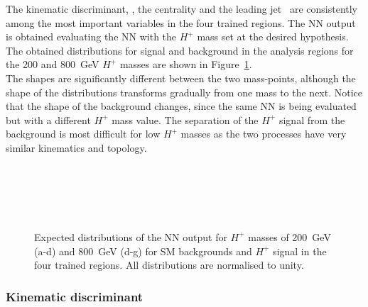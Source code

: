 The kinematic discriminant, \HTjets, the centrality and the leading jet \pT\ are consistently among the most important variables in the four trained regions. The NN output is obtained evaluating the NN with the $H^+$ mass set at the desired hypothesis. The obtained distributions for signal and background in the analysis regions for the 200 and 800~GeV $H^+$ masses are shown in Figure~\ref{Hplustb:NNshapes}.\\

The shapes are significantly different between the two mass-points, although the shape of the distributions transforms gradually from one mass to the next. Notice that the shape of the background changes, since the same NN is being evaluated but with a different $H^+$ mass value. The separation of the $H^+$ signal from the background is most difficult for low $H^+$ masses as the two processes have very similar kinematics and topology.

\begin{figure}[htb]
    \RawFloats
    \centering
     \\
     \\
     \\
     \\
    \caption{Expected distributions of the NN output for $H^+$ masses of 200~GeV (a-d)
    and 800~GeV (d-g) for SM backgrounds and $H^+$ signal in the four trained regions.
    All distributions are normalised to unity.
    }
    \label{Hplustb:NNshapes}
\end{figure}
\clearpage
\subsubsection{Kinematic discriminant}
\label{Hplustb:SectionHplusDiscriminant}

